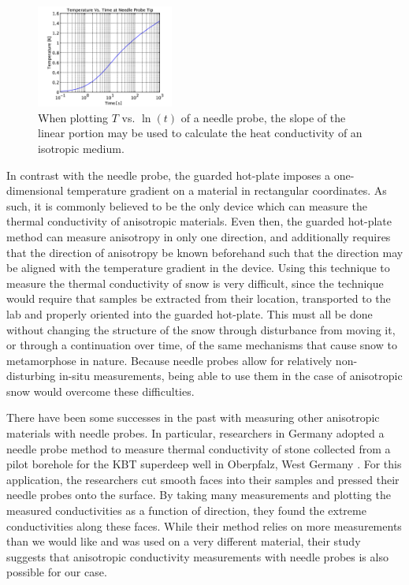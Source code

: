 \documentclass[12pt, letterpaper]{article}
\begin{document}
\begin{figure}
\centering
\label{fig:loggraph}
\includegraphics[width=0.4\textwidth]{lolg_scale}
\caption{When plotting \(T\) vs. \(\ln(t)\) of a needle probe, the slope of the linear portion may be used to calculate the heat conductivity of an isotropic medium.}
\end{figure}

In contrast with the needle probe, the guarded hot-plate imposes a one-dimensional temperature gradient on a material in rectangular coordinates. As such, it is commonly believed to be the only device which can measure the thermal conductivity of anisotropic materials. Even then, the guarded hot-plate method can measure anisotropy in only one direction, and additionally requires that the direction of anisotropy be known beforehand such that the direction may be aligned with the temperature gradient in the device. Using this technique to measure the thermal conductivity of snow is very difficult, since the technique would require that samples be extracted from their location, transported to the lab and properly oriented into the guarded hot-plate. This must all be done without changing the structure of the snow through disturbance from moving it, or through a continuation over time, of the same mechanisms that cause snow to metamorphose in nature. Because needle probes allow for relatively non-disturbing in-situ measurements, being able to use them in the case of anisotropic snow would overcome these difficulties.

There have been some successes in the past with measuring other anisotropic materials with needle probes. In particular, researchers in Germany adopted a needle probe method to measure thermal conductivity of stone collected from a pilot borehole for the KBT superdeep well in Oberpfalz, West Germany \cite{ktb}. For this application, the researchers cut smooth faces into their samples and pressed their needle probes onto the surface. By taking many measurements and plotting the measured conductivities as a function of direction, they found the extreme conductivities along these faces. While their method relies on more measurements than we would like and was used on a very different material, their study suggests that anisotropic conductivity measurements with needle probes is also possible for our case.
\end{document}
